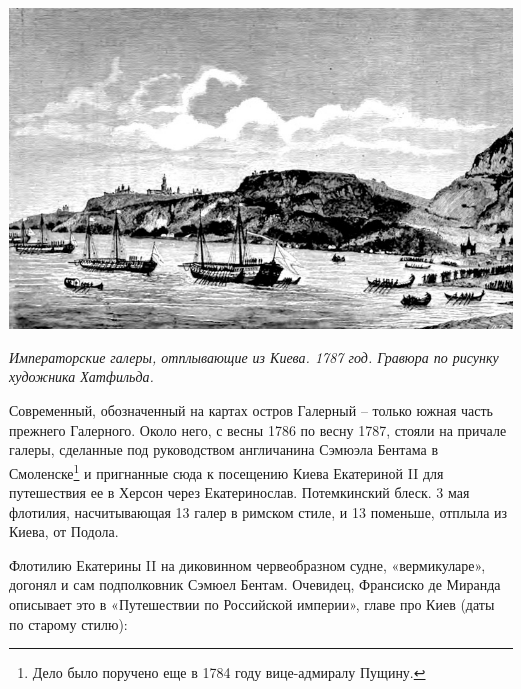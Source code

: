 \begin{center}
\includegraphics[width=\textwidth]{chast-lys-gory/zazver/otplytie-ekateriny-iz-kieva-1787.jpg}

\textit{Императорские галеры, отплывающие из Киева. 1787 год. Гравюра по рисунку художника Хатфильда.}
\end{center}

Современный, обозначенный на картах остров Галерный – только южная часть прежнего Галерного. Около него, с весны 1786 по весну 1787, стояли на причале галеры, сделанные под руководством англичанина Сэмюэла Бентама в Смоленске\footnote{Дело было поручено еще в 1784 году вице-адмиралу Пущину.} и пригнанные сюда к посещению Киева Екатериной II для путешествия ее в Херсон через Екатеринослав. Потемкинский блеск. 3 мая флотилия, насчитывающая 13 галер в римском стиле, и 13 поменьше, отплыла из Киева, от Подола.

Флотилию Екатерины II на диковинном червеобразном судне, «вермикуларе», догонял и сам подполковник Сэмюел Бентам. Очевидец, Франсиско де Миранда описывает это в «Путешествии по Российской империи», главе про Киев (даты по старому стилю)\cite{demiranda}:


